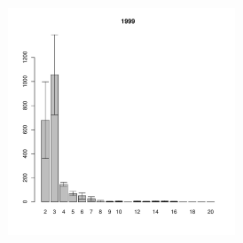 \begin{figure}[hp]
\begin{minipage}[b]{.3\linewidth}
\begin{center}
	\end{center}
	\end{minipage}
	\hfil %
	\begin{minipage}[b]{.3\linewidth}
	\begin{center}
	\includegraphics[width=60mm]{../White_Sea/Estuatiy_Luvenga/sizestr2_1999_.pdf}
	\end{center}
	\end{minipage}



\end{figure}

